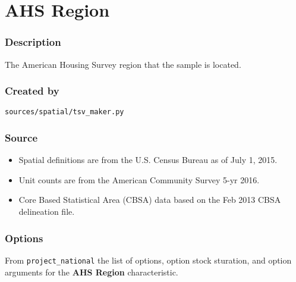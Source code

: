 \section{AHS Region}\label{ahs_region}

\subsubsection{Description}\label{description}

The American Housing Survey region that the sample is located.

\subsubsection{Created by}\label{created-by}

\texttt{sources/spatial/tsv\_maker.py}

\subsubsection{Source}\label{source}

\begin{itemize}
%  
\item
  Spatial definitions are from the U.S. Census Bureau as of July 1,
  2015.
\item
  Unit counts are from the American Community Survey 5-yr 2016.
\item
  Core Based Statistical Area (CBSA) data based on the Feb 2013 CBSA
  delineation file.
\end{itemize}

\subsubsection{Options}\label{options}

From \texttt{project\_national} the list of options, option stock
sturation, and option arguments for the \textbf{AHS Region}
characteristic.

